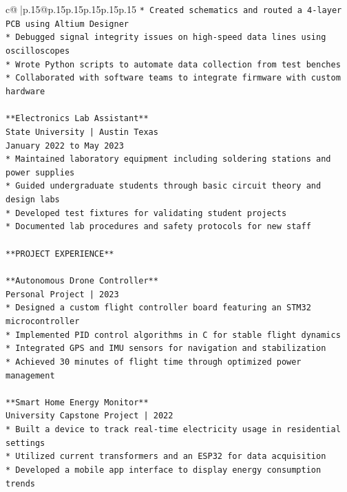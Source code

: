 \documentclass{article}
\begin{document}
{\begin{supertabular}{c@{$\;$}|p{.15\linewidth}@{}p{.15\linewidth}p{.15\linewidth}p{.15\linewidth}p{.15\linewidth}p{.15\linewidth}}
{{{\texttt{*   Created schematics and routed a 4{-}layer PCB using Altium Designer} \\
\texttt{*   Debugged signal integrity issues on high{-}speed data lines using oscilloscopes} \\
\texttt{*   Wrote Python scripts to automate data collection from test benches} \\
\texttt{*   Collaborated with software teams to integrate firmware with custom hardware} \\
\\ 
\texttt{**Electronics Lab Assistant**} \\
\texttt{State University | Austin Texas} \\
\texttt{January 2022 to May 2023} \\
\texttt{*   Maintained laboratory equipment including soldering stations and power supplies} \\
\texttt{*   Guided undergraduate students through basic circuit theory and design labs} \\
\texttt{*   Developed test fixtures for validating student projects} \\
\texttt{*   Documented lab procedures and safety protocols for new staff} \\
\\ 
\texttt{**PROJECT EXPERIENCE**} \\
\\ 
\texttt{**Autonomous Drone Controller**} \\
\texttt{Personal Project | 2023} \\
\texttt{*   Designed a custom flight controller board featuring an STM32 microcontroller} \\
\texttt{*   Implemented PID control algorithms in C for stable flight dynamics} \\
\texttt{*   Integrated GPS and IMU sensors for navigation and stabilization} \\
\texttt{*   Achieved 30 minutes of flight time through optimized power management} \\
\\ 
\texttt{**Smart Home Energy Monitor**} \\
\texttt{University Capstone Project | 2022} \\
\texttt{*   Built a device to track real{-}time electricity usage in residential settings} \\
\texttt{*   Utilized current transformers and an ESP32 for data acquisition} \\
\texttt{*   Developed a mobile app interface to display energy consumption trends} \\
}}}
\end{supertabular}}
\end{document}
